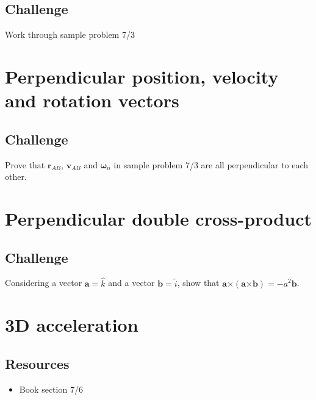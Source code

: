 \subsection*{Challenge}
Work through sample problem 7/3




\newpage
\section{Perpendicular position, velocity and rotation vectors}

\subsection*{Challenge}
Prove that $\bm{r}_{AB}$, $\bm{v}_{AB}$ and $\bm{\omega}_n$ in sample problem 7/3 are all perpendicular to each other.




\newpage
\section{Perpendicular double cross-product}

\subsection*{Challenge}
Considering a vector $\bm{a} = \hat{k}$ and a vector $\bm{b} = \hat{i}$, show that $\bm{a} \bm{\times} (\bm{a} \bm{\times} \bm{b}) = -a^2 \bm{b}$.




\newpage
\section{3D acceleration}

\subsection*{Resources}
\begin{itemize}
    \item Book section 7/6
\end{itemize}

